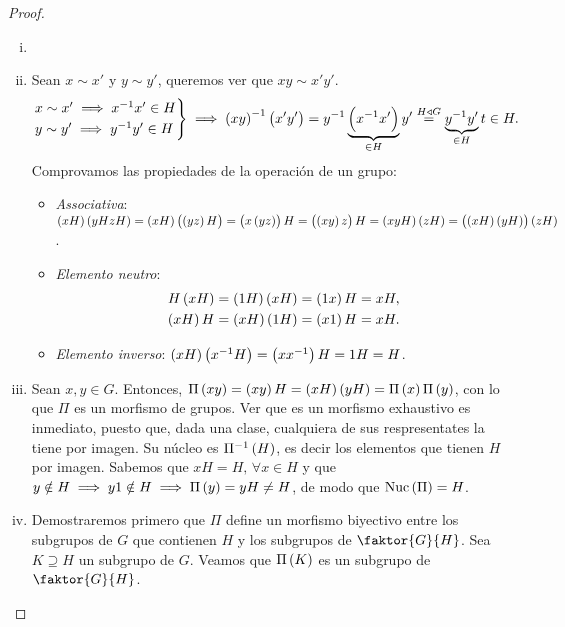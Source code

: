\begin{proof}%
    \begin{enumerate}[i)]
        \item[]
        \item Sean $x\sim x'$ y $y\sim y'$, queremos ver que $xy\sim x'y'$.
            \[
                \begin{rcases}
                    x\sim x' \implies x^{-1}x' \in H\\
                    y\sim y' \implies y^{-1}y' \in H
                \end{rcases}
                \implies \left( xy\right) ^{-1}\left( x'y'\right) = y^{-1} \underbrace{\left( x^{-1}x'\right)}_{\in H} y'\stackrel{H\triangleleft G}{=} \underbrace{y^{-1}y'}_{\in H}t \in H.
            \]
            Comprovamos las propiedades de la operación de un grupo:
            \begin{itemize}
                \item \emph{Associativa}: $\left( xH\right)\left( yHzH\right) = \left( xH\right) \left(\left( yz\right) H\right) = \left( x\left( yz\right) \right) H = \left( \left( xy\right) z\right) H = \left( xyH\right) \left( zH\right) = \left( \left( xH\right) \left( yH\right) \right) \left( zH\right)$.
                \item \emph{Elemento neutro}:
                    \begin{align*}
                        H\left( xH\right) &= \left( 1H\right) \left( xH\right) = \left( 1x\right) H = xH, \\
                        \left( xH\right) H &= \left( xH\right) \left( 1H\right) = \left( x1\right) H = xH.
                    \end{align*}
                \item \emph{Elemento inverso}: $\left( xH\right)\left( x^{-1}H\right) = \left( xx^{-1}\right) H = 1H = H$.
            \end{itemize}
        \item Sean $x, y\in G$. Entonces, $\Pi\left( xy\right) = \left( xy\right) H=\left( xH\right)\left( yH\right) = \Pi\left( x\right)\Pi\left( y\right)$, con lo que $\Pi$ es un morfismo de grupos. Ver que es un morfismo exhaustivo es inmediato, puesto que, dada una clase, cualquiera de sus respresentates la tiene por imagen. Su núcleo es $\Pi^{-1}\left( H\right)$, es decir los elementos que tienen $H$ por imagen. Sabemos que $xH=H,\,\forall x\in H$ y que $y\notin H\implies y1\notin H\implies \Pi\left( y\right)=yH\neq H$, de modo que $\operatorname{Nuc}\left(\Pi\right)=H$.
        \item Demostraremos primero que $\Pi$ define un morfismo biyectivo entre los subgrupos de $G$ que contienen $H$ y los subgrupos de $\faktor{G}{H}$. Sea $K\supseteq H$ un subgrupo de $G$. Veamos que $\Pi\left( K\right)$ es un subgrupo de $\faktor{G}{H}$.

\end{enumerate}
\end{proof}
